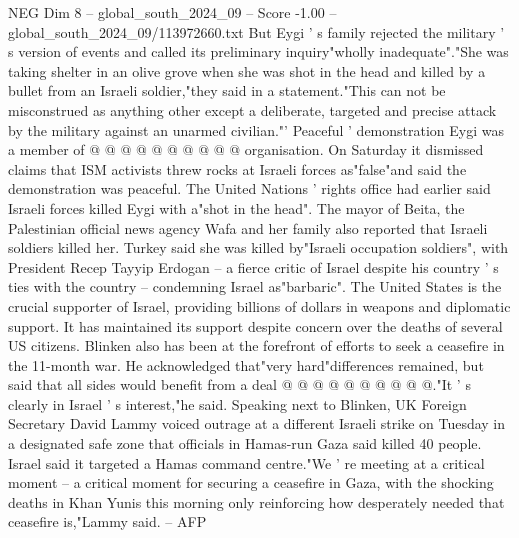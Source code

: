 \begin{textsample}{NEG Dim 8 – global\_south\_2024\_09 – Score -1.00 – global\_south\_2024\_09/113972660.txt}
But Eygi ' s family rejected the military ' s version of events and called its preliminary inquiry"wholly inadequate"."She was taking shelter in an olive grove when she was shot in the head and killed by a bullet from an Israeli soldier,"they said in a statement."This can not be misconstrued as anything other except a deliberate, targeted and precise attack by the military against an unarmed civilian."' Peaceful ' demonstration Eygi was a member of @ @ @ @ @ @ @ @ @ @ organisation.
On Saturday it dismissed claims that ISM activists threw rocks at Israeli forces as"false"and said the demonstration was peaceful.
The United Nations ' rights office had earlier said Israeli forces killed Eygi with a"shot in the head".
The mayor of Beita, the Palestinian official news agency Wafa and her family also reported that Israeli soldiers killed her.
Turkey said she was killed by"Israeli occupation soldiers", with President Recep Tayyip Erdogan -- a fierce critic of Israel despite his country ' s ties with the country -- condemning Israel as"barbaric".
The United States is the crucial supporter of Israel, providing billions of dollars in weapons and diplomatic support.
It has maintained its support despite concern over the deaths of several US citizens.
Blinken also has been at the forefront of efforts to seek a ceasefire in the 11-month war.
He acknowledged that"very hard"differences remained, but said that all sides would benefit from a deal @ @ @ @ @ @ @ @ @ @."It ' s clearly in Israel ' s interest,"he said.
Speaking next to Blinken, UK Foreign Secretary David Lammy voiced outrage at a different Israeli strike on Tuesday in a designated safe zone that officials in Hamas-run Gaza said killed 40 people.
Israel said it targeted a Hamas command centre."We ' re meeting at a critical moment -- a critical moment for securing a ceasefire in Gaza, with the shocking deaths in Khan Yunis this morning only reinforcing how desperately needed that ceasefire is,"Lammy said. -- AFP

\end{textsample}
